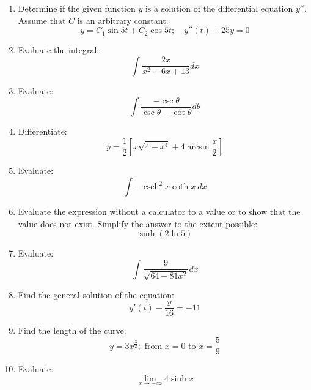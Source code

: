 \documentclass[fleqn]{article}
\DeclareMathOperator{\csch}{csch}
\begin{document}
\begin{multicols}{2}
\begin{enumerate}
\item Determine if the given function \(y\) is a solution of the differential equation \(y''\). Assume that \(C\) is an arbitrary constant.
\[y=C_1\sin 5t+C_2\cos 5t;\quad y''(t)+25y=0\]

\item Evaluate the integral:
\[\int\frac{2x}{x^2+6x+13}dx\]

\item Evaluate:
\[\int\frac{-\csc\theta}{\csc\theta-\cot\theta}d\theta\]

\item Differentiate:
\[y=\frac{1}{2}\left[x\sqrt{4-x^4}+4\arcsin\frac{x}{2}\right]\]

\item Evaluate:
\[\int-\csch^2 x\coth x\ dx\]

\item Evaluate the expression without a calculator to a value or to show that the value does not exist. Simplify the answer to the extent possible:
\[\sinh(2\ln 5)\]

\item Evaluate:
\[\int\frac{9}{\sqrt{64-81x^2}}dx\]

\item Find the general solution of the equation:
\[y'(t)-\frac{y}{16}=-11\]

\item Find the length of the curve:
\[y=3x^{\frac{3}{2}};\text{ from }x=0\text{ to }x=\frac{5}{9}\]

\item Evaluate:
\[\lim_{x\to-\infty}4\sinh x\]

\end{enumerate}
\end{multicols}
\end{document}
